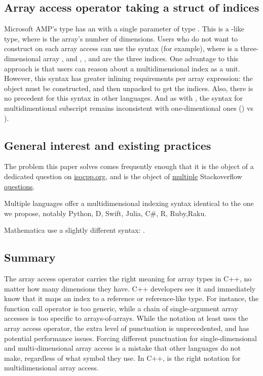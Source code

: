\documentclass{wg21}
\begin{document}
\subsection{Array access operator taking a struct of indices}

Microsoft AMP's  type has an  with a single parameter of type .  This is a -like type, where  is the array's number of dimensions.  Users who do not want to construct  on each array access can use the syntax  (for example), where  is a three-dimensional array , and , , and  are the three indices.  One advantage to this approach is that users can reason about a multidimensional index as a unit.  However, this syntax has greater inlining requirements per array expression: the  object must be constructed, and then unpacked to get the indices.  Also, there is no precedent for this  syntax in other languages. And as with , the syntax for multidimentional subscript remains inconsistent with one-dimentional ones () vs ).

\subsection{General interest and existing practices}

The problem this paper solves comes frequently enough that it is the object of a dedicated question on \href{https://isocpp.org/wiki/faq/operator-overloading#matrix-subscript-op}{isocpp.org},
and is the object of \href{https://stackoverflow.com/questions/7032743/can-cs-operator-take-more-than-one-argument}{multiple} Stackoverflow \href{https://stackoverflow.com/questions/1936399/c-array-operator-with-multiple-arguments/1936410}{questions}.

Multiple languages offer a multidimensional indexing syntax identical to the one we propose, notably Python, D, Swift, Julia, C\#, R, Ruby,Raku.

Mathematica use a slightly different syntax: .

\subsection{Summary}

The array access operator carries the right meaning for array types in C++, no matter how many dimensions they have.  C++ developers see it and immediately know that it maps an index to a reference or reference-like type.  For instance, the function call operator is too generic, while a chain of single-argument array accesses is too specific to arrays-of-arrays.  While the notation  at least uses the array access operator, the extra level of punctuation is unprecedented, and has potential performance issues.  Forcing different punctuation for single-dimensional and multi-dimensional array access is a mistake that other languages do not make, regardless of what symbol they use.  In C++,  is the right notation for multidimensional array access.
\end{document}
